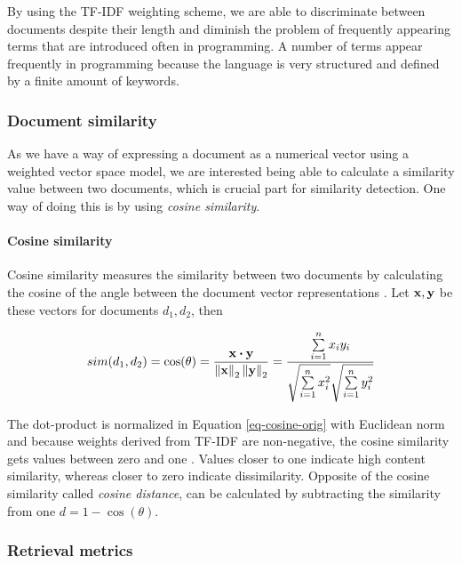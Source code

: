 By using the TF-IDF weighting scheme, we are able to discriminate between documents despite their length and diminish the problem of frequently appearing terms that are introduced often in programming. A number of terms appear frequently in programming because the language is very structured and defined by a finite amount of keywords. 

\subsubsection{Document similarity} \label{chap-bg-sim}

As we have a way of expressing a document as a numerical vector using a weighted vector space model, we are interested being able to calculate a similarity value between two documents, which is crucial part for similarity detection. One way of doing this is by using \emph{cosine similarity}.

\paragraph{Cosine similarity}

Cosine similarity measures the similarity between two documents by calculating the cosine of the angle between the document vector representations \cite{Manning:2008:IIR:1394399}. Let $\mathbf{x}, \mathbf{y}$ be these vectors for documents $d_1, d_2$, then

\begin{equation} \label{eq-cosine-orig}
    sim(d_1, d_2) = \cos(\theta) = \dfrac{\mathbf{x} \boldsymbol{\cdot} \mathbf{y}}
                          {\left\lVert\mathbf{x}\right\rVert_2 \left\lVert\mathbf{y}\right\rVert_2} = 
                          \dfrac{\sum \limits_{i=1}^n x_i y_i}
                                {\sqrt{\sum \limits_{i=1}^n {x}_i^2} \sqrt{\sum \limits_{i=1}^n y_i^2}}
\end{equation}

\noindent
The dot-product is normalized in Equation \ref{eq-cosine-orig} with Euclidean norm and because weights derived from TF-IDF are non-negative, the cosine similarity gets values between zero and one \cite{Manning:2008:IIR:1394399}. Values closer to one indicate high content similarity, whereas closer to zero indicate dissimilarity. Opposite of the cosine similarity called \emph{cosine distance}, can be calculated by subtracting the similarity from one \ie $d = 1 - \cos(\theta)$.

\subsubsection{Retrieval metrics}

